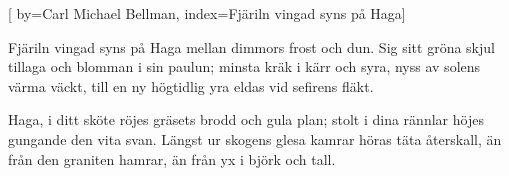 


[ 	%
	by={Carl Michael Bellman}, %
	index={Fjäriln vingad syns på Haga}]	%
	
\beginverse*		%
Fjäriln vingad syns på Haga
mellan dimmors frost och dun.
Sig sitt gröna skjul tillaga
och blomman i sin paulun;
minsta kräk i kärr och syra,
nyss av solens värma väckt,
till en ny högtidlig yra
eldas vid sefirens fläkt.
\endverse			%

\beginverse*		%
Haga, i ditt sköte röjes
gräsets brodd och gula plan;
stolt i dina rännlar höjes
gungande den vita svan.
Längst ur skogens glesa kamrar
höras täta återskall,
än från den graniten hamrar,
än från yx i björk och tall.
\endverse			%
\endsong			%
